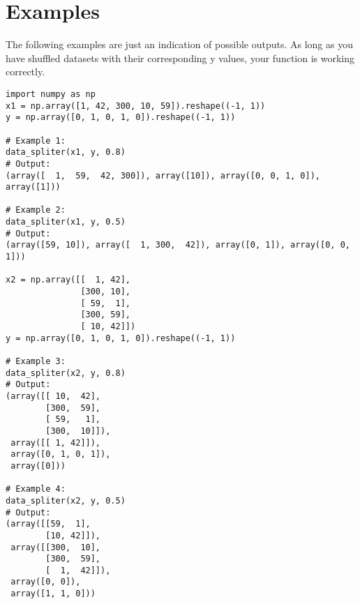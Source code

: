 
\section*{Examples}
The following examples are just an indication of possible outputs. As long as you have shuffled datasets with their corresponding y values, your function is working correctly.

\begin{verbatim}
import numpy as np
x1 = np.array([1, 42, 300, 10, 59]).reshape((-1, 1))
y = np.array([0, 1, 0, 1, 0]).reshape((-1, 1))

# Example 1:
data_spliter(x1, y, 0.8)
# Output:
(array([  1,  59,  42, 300]), array([10]), array([0, 0, 1, 0]), array([1]))

# Example 2:
data_spliter(x1, y, 0.5)
# Output:
(array([59, 10]), array([  1, 300,  42]), array([0, 1]), array([0, 0, 1]))

x2 = np.array([[  1, 42],
               [300, 10],
               [ 59,  1],
               [300, 59],
               [ 10, 42]])
y = np.array([0, 1, 0, 1, 0]).reshape((-1, 1))

# Example 3:
data_spliter(x2, y, 0.8)
# Output:
(array([[ 10,  42],
        [300,  59],
        [ 59,   1],
        [300,  10]]),
 array([[ 1, 42]]),
 array([0, 1, 0, 1]),
 array([0]))

# Example 4:
data_spliter(x2, y, 0.5)
# Output:
(array([[59,  1],
        [10, 42]]),
 array([[300,  10],
        [300,  59],
        [  1,  42]]),
 array([0, 0]),
 array([1, 1, 0]))
\end{verbatim}